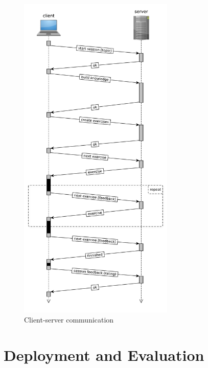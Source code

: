 \documentclass[12pt, twoside]{fithesis2}		%
\renewcommand{\_}{\leavevmode \kern0.07em\vbox{\hrule width0.4em}}
\begin{document}

\begin{figure}[h]
  \centering
  \includegraphics[width=0.66\textwidth]{images/client-server-communication.pdf}
  \caption{Client-server communication}
  \label{fig:client-server-communication}
\end{figure}


\chapter{Deployment and Evaluation}
\label{chap:evaluation}
\end{document}
